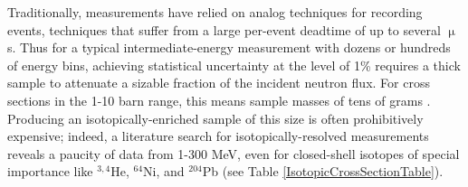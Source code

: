 Traditionally, \tots measurements have relied on analog techniques for recording
events, techniques that suffer from a large per-event deadtime of
up to several $\upmu$s. Thus for a typical intermediate-energy \totEs measurement
with dozens or hundreds of energy bins, achieving statistical uncertainty at the
level of 1\% requires a thick sample to attenuate a sizable fraction of the
incident neutron flux. For cross sections in the 1-10 barn range, this means
sample masses of tens of grams \cite{Finlay1993, Abfalterer2001}.
Producing an isotopically-enriched sample of this size is often
prohibitively expensive; indeed, a literature search for isotopically-resolved
\tots measurements reveals a paucity of data from 1-300 MeV, even for
closed-shell isotopes of special importance like $^{3,4}$He, $^{64}$Ni, and
$^{204}$Pb (see Table \ref{IsotopicCrossSectionTable}).


